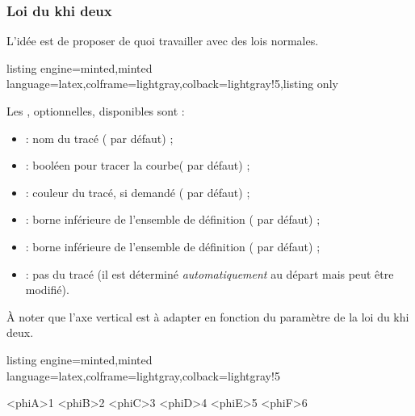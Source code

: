 \documentclass[11pt,a4paper]{ltxdoc}
\begin{document}
\pagebreak

\subsubsection{Loi du khi deux}\label{loikhideux}

L'idée est de proposer de quoi travailler avec des lois normales.

\begin{tcblisting}{listing engine=minted,minted language=latex,colframe=lightgray,colback=lightgray!5,listing only}
\end{tcblisting}

Les \MontreCode{[clés]}, optionnelles, disponibles sont :

\smallskip

\begin{itemize}
  \item {} : nom du tracé ( par défaut) ;
  \item {} : booléen pour tracer la courbe( par défaut) ;
  \item {} : couleur du tracé, si demandé ( par défaut) ;
  \item {} : borne inférieure de l'ensemble de définition ( par défaut) ;
  \item {} : borne inférieure de l'ensemble de définition ( par défaut) ;
  \item {} : pas du tracé (il est déterminé \textit{automatiquement} au départ mais peut être modifié).
\end{itemize}

À noter que l'axe vertical est à adapter en fonction du paramètre de la loi du khi deux.

\begin{tcblisting}{listing engine=minted,minted language=latex,colframe=lightgray,colback=lightgray!5}
\begin{GraphiqueTikz}[
    x=1.5cm,y=7.5cm,
    Xmin=0,Xmax=8,Xgrille=1,Xgrilles=0.5,
    Ymin=0,Ymax=0.5,Ygrille=0.1,Ygrilles=0.05
    ]
  \DefinirLoiKhiDeux[Couleur=red,Debut=0.25,Trace]<phiA>{1}
  \DefinirLoiKhiDeux[Couleur=blue,Trace]<phiB>{2}
  \DefinirLoiKhiDeux[Couleur=orange,Trace]<phiC>{3}
  \DefinirLoiKhiDeux[Couleur=violet,Trace]<phiD>{4}
  \DefinirLoiKhiDeux[Couleur=yellow,Trace]<phiE>{5}
  \DefinirLoiKhiDeux[Couleur=teal,Trace]<phiF>{6}
\end{GraphiqueTikz}
\end{tcblisting}
\end{document}
